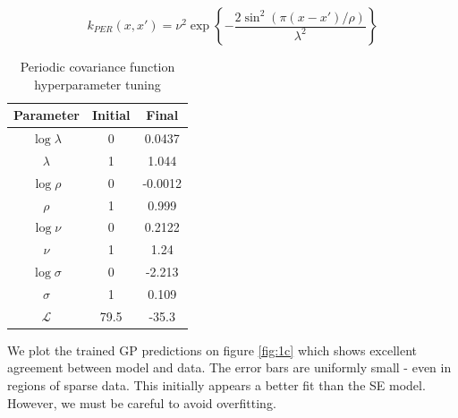 \documentclass[]{article}
\newcommand{\Lcal}{\mathcal{L}}
\begin{document}
\begin{equation}
k_{PER}(x, x') = \nu^2 \exp
\left\{
- \frac{2 \sin ^2 \left( \pi (x-x') / \rho \right)}{\lambda^2}
\right\}
\label{eqn:covPeriodic}
\end{equation}

\begin{table}[!h]
\centering
\begin{tabular}{c | c c}
	\textbf{Parameter} & \textbf{Initial} & \textbf{Final} \\ \hline
	$\log \lambda$     & 0                & 0.0437         \\
	$\lambda$          & 1                & 1.044          \\
	$\log \rho$        & 0                & -0.0012        \\
	$\rho$             & 1                & 0.999          \\
	$\log \nu$         & 0                & 0.2122         \\
	$\nu$              & 1                & 1.24           \\ 
	$\log \sigma$      & 0                & -2.213         \\
	$\sigma$           & 1                & 0.109          \\ \hline
	$\Lcal$            & 79.5             & -35.3
\end{tabular}
\caption{Periodic covariance function hyperparameter tuning}
\label{tab:per}
\end{table}

We plot the trained GP predictions on figure \ref{fig:1c} which shows excellent agreement between model and data. The error bars are uniformly small - even in regions of sparse data. This initially appears a better fit than the SE model. However, we must be careful to avoid overfitting.
\end{document}
